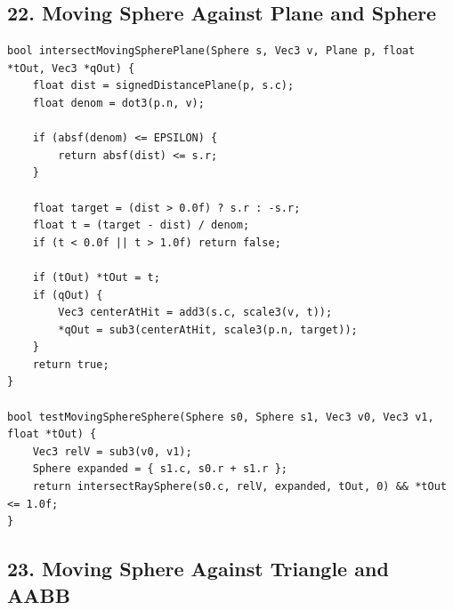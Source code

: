 \documentclass[10pt,letterpaper]{article}
\begin{document}
\subsection*{22. Moving Sphere Against Plane and Sphere}

\begin{verbatim}
bool intersectMovingSpherePlane(Sphere s, Vec3 v, Plane p, float *tOut, Vec3 *qOut) {
    float dist = signedDistancePlane(p, s.c);
    float denom = dot3(p.n, v);

    if (absf(denom) <= EPSILON) {
        return absf(dist) <= s.r;
    }

    float target = (dist > 0.0f) ? s.r : -s.r;
    float t = (target - dist) / denom;
    if (t < 0.0f || t > 1.0f) return false;

    if (tOut) *tOut = t;
    if (qOut) {
        Vec3 centerAtHit = add3(s.c, scale3(v, t));
        *qOut = sub3(centerAtHit, scale3(p.n, target));
    }
    return true;
}

bool testMovingSphereSphere(Sphere s0, Sphere s1, Vec3 v0, Vec3 v1, float *tOut) {
    Vec3 relV = sub3(v0, v1);
    Sphere expanded = { s1.c, s0.r + s1.r };
    return intersectRaySphere(s0.c, relV, expanded, tOut, 0) && *tOut <= 1.0f;
}
\end{verbatim}


\subsection*{23. Moving Sphere Against Triangle and AABB}
\end{document}
